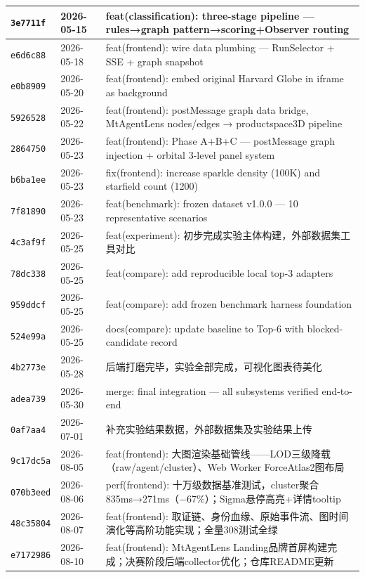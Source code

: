 \documentclass[a4paper]{ctexart}
\makeatletter
\renewcommand{\_}{%
  \ifmmode
    \nfss@text{\textunderscore}%
  \else
    \textunderscore\discretionary{}{}{}%
  \fi}
\makeatother
\begin{document}
{\begin{longtable}{@{} p{3.3cm} p{2.0cm} p{9.7cm} @{}}
\texttt{3e7711f} & 2026-05-15 & feat(classification): three-stage pipeline — rules→graph pattern→scoring+Observer routing \\
\hline
\texttt{e6d6c88} & 2026-05-18 & feat(frontend): wire data plumbing — RunSelector + SSE + graph\_snapshot \\
\hline
\texttt{e0b8909} & 2026-05-20 & feat(frontend): embed original Harvard Globe in iframe as background \\
\hline
\texttt{5926528} & 2026-05-22 & feat(frontend): postMessage graph data bridge, MtAgentLens nodes/edges → productspace3D pipeline \\
\hline
\texttt{2864750} & 2026-05-23 & feat(frontend): Phase A+B+C — postMessage graph injection + orbital 3-level panel system \\
\hline
\texttt{b6ba1ee} & 2026-05-23 & fix(frontend): increase sparkle density (100K) and starfield count (1200) \\
\hline
\texttt{7f81890} & 2026-05-23 & feat(benchmark): frozen dataset v1.0.0 — 10 representative scenarios \\
\hline
\texttt{4c3af9f} & 2026-05-25 & feat(experiment): 初步完成实验主体构建，外部数据集工具对比 \\
\hline
\texttt{78dc338} & 2026-05-25 & feat(compare): add reproducible local top-3 adapters \\
\hline
\texttt{959ddcf} & 2026-05-25 & feat(compare): add frozen benchmark harness foundation \\
\hline
\texttt{524e99a} & 2026-05-25 & docs(compare): update baseline to Top-6 with blocked-candidate record \\
\hline
\texttt{4b2773e} & 2026-05-28 & 后端打磨完毕，实验全部完成，可视化图表待美化 \\
\hline
\texttt{adea739} & 2026-05-30 & merge: final integration — all subsystems verified end-to-end \\
\hline
\texttt{0af7aa4} & 2026-07-01 & 补充实验结果数据，外部数据集及实验结果上传 \\
\hline
\texttt{9c17dc5a} & 2026-08-05 & feat(frontend): 大图渲染基础管线——LOD三级降载（raw/agent/cluster）、Web Worker ForceAtlas2图布局 \\
\hline
\texttt{070b3eed} & 2026-08-06 & perf(frontend): 十万级数据基准测试，cluster聚合835ms→271ms（$-$67\%）；Sigma悬停高亮+详情tooltip \\
\hline
\texttt{48c35804} & 2026-08-07 & feat(frontend): 取证链、身份血缘、原始事件流、图时间演化等高阶功能实现；全量308测试全绿 \\
\hline
\texttt{e7172986} & 2026-08-10 & feat(frontend): MtAgentLens Landing品牌首屏构建完成；决赛阶段后端collector优化；仓库README更新 \\
\hline
\end{longtable}
\par}
\end{document}
